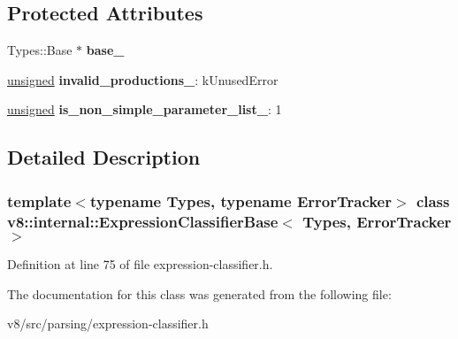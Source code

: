 \subsection*{Protected Attributes}
\begin{DoxyCompactItemize}
\item 
\mbox{\label{classv8_1_1internal_1_1ExpressionClassifierBase_a983151d7bfcb6491f3424cd610a91de7}} 
Types\+::\+Base $\ast$ {\bfseries base\+\_\+}
\item 
\mbox{\label{classv8_1_1internal_1_1ExpressionClassifierBase_aff227b4b99d43b298cd38ce11e5c1906}} 
\mbox{\hyperlink{classunsigned}{unsigned}} {\bfseries invalid\+\_\+productions\+\_\+}\+: k\+Unused\+Error
\item 
\mbox{\label{classv8_1_1internal_1_1ExpressionClassifierBase_a8662e4e61e45e2675079317ae0de0981}} 
\mbox{\hyperlink{classunsigned}{unsigned}} {\bfseries is\+\_\+non\+\_\+simple\+\_\+parameter\+\_\+list\+\_\+}\+: 1
\end{DoxyCompactItemize}


\subsection{Detailed Description}
\subsubsection*{template$<$typename Types, typename Error\+Tracker$>$\newline
class v8\+::internal\+::\+Expression\+Classifier\+Base$<$ Types, Error\+Tracker $>$}



Definition at line 75 of file expression-\/classifier.\+h.



The documentation for this class was generated from the following file\+:\begin{DoxyCompactItemize}
\item 
v8/src/parsing/expression-\/classifier.\+h\end{DoxyCompactItemize}
